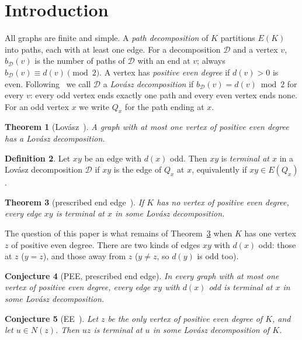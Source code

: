 \documentclass[11pt]{amsart}
\newtheorem{theorem}{Theorem}[section]
\newtheorem{conjecture}[theorem]{Conjecture}
\theoremstyle{definition}
\newtheorem{definition}[theorem]{Definition}
\newcommand{\cD}{\mathcal D}
\begin{document}
\section{Introduction}\label{sec:intro}

All graphs are finite and simple. A \emph{path decomposition} of $K$ partitions $E(K)$ into paths,
each with at least one edge. For a decomposition $\cD$ and a vertex $v$, $b_\cD(v)$ is the number of
paths of $\cD$ with an end at $v$; always $b_\cD(v)\equiv d(v)\pmod 2$. A vertex has \emph{positive
even degree} if $d(v)>0$ is even. Following~\cite{RD} we call $\cD$ a \emph{Lov\'asz decomposition}
if $b_\cD(v)=d(v)\bmod 2$ for every $v$: every odd vertex ends exactly one path and every even vertex
ends none. For an odd vertex $x$ we write $Q_x$ for the path ending at $x$.

\begin{theorem}[Lov\'asz~\cite{L68}]\label{thm:lovasz}
A graph with at most one vertex of positive even degree has a Lov\'asz decomposition.
\end{theorem}

\begin{definition}
Let $xy$ be an edge with $d(x)$ odd. Then $xy$ is \emph{terminal at $x$} in a Lov\'asz
decomposition $\cD$ if $xy$ is the edge of $Q_x$ at $x$, equivalently if $xy\in E(Q_x)$.
\end{definition}

\begin{theorem}[prescribed end edge~{\cite[Theorem~14]{MS}}]\label{thm:endedge}
If $K$ has no vertex of positive even degree, every edge $xy$ is terminal at $x$ in some Lov\'asz
decomposition.
\end{theorem}

The question of this paper is what remains of Theorem~\ref{thm:endedge} when $K$ has one vertex $z$
of positive even degree. There are two kinds of edges $xy$ with $d(x)$ odd: those at $z$ ($y=z$), and
those away from $z$ ($y\ne z$, so $d(y)$ is odd too).

\begin{conjecture}[PEE, prescribed end edge]\label{conj:pee}
In every graph with at most one vertex of positive even degree, every edge $xy$ with $d(x)$ odd is
terminal at $x$ in some Lov\'asz decomposition.
\end{conjecture}

\begin{conjecture}[EE~{\cite[Conjecture~17]{MS}}]\label{conj:ee}
Let $z$ be the only vertex of positive even degree of $K$, and let $u\in N(z)$. Then $uz$ is terminal
at $u$ in some Lov\'asz decomposition of $K$.
\end{conjecture}
\end{document}
